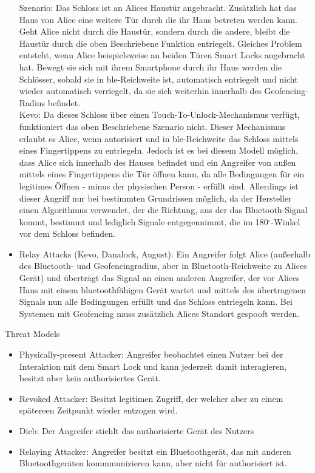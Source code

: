 \begin{itemize}
        Szenario: Das Schloss ist an Alices Haustür angebracht.
        Zusätzlich hat das Haus von Alice eine weitere Tür durch die ihr Haus betreten werden kann.
        Geht Alice nicht durch die Haustür, sondern durch die andere, bleibt die Haustür durch die oben Beschriebene Funktion entriegelt.
        Gleiches Problem entsteht, wenn Alice beispielsweise an beiden Türen Smart Locks angebracht hat.
        Bewegt sie sich mit ihrem Smartphone durch ihr Haus werden die Schlösser, sobald sie in \gls{ble}-Reichweite ist, automatisch entriegelt und nicht wieder automatisch verriegelt, da sie sich weiterhin innerhalb des Geofencing-Radius befindet.\\
        Kevo: Da dieses Schloss über einen Touch-To-Unlock-Mechanismus verfügt, funktioniert das oben Beschriebene Szenario nicht.
        Dieser Mechanismus erlaubt es Alice, wenn autorisiert und in \gls{ble}-Reichweite das Schloss mittels eines Fingertippens zu entriegeln.
        Jedoch ist es bei diesem Modell möglich, dass Alice sich innerhalb des Hauses befindet und ein Angreifer von außen mittels eines Fingertippens die Tür öffnen kann, da alle Bedingungen für ein legitimes Öffnen - minus der physischen Person - erfüllt sind.
        Allerdings ist dieser Angriff nur bei bestimmten Grundrissen möglich, da der Hersteller einen Algorithmus verwendet, der die Richtung, aus der das Bluetooth-Signal kommt, bestimmt und lediglich Signale entgegennimmt, die im 180$^{\circ}$-Winkel vor dem Schloss befinden.
        \item Relay Attacks (Kevo, Danalock, August): Ein Angreifer folgt Alice (außerhalb des Bluetooth- und Geofencingradius, aber in Bluetooth-Reichweite zu Alices Gerät) und überträgt das Signal an einen anderen Angreifer, der vor Alices Haus mit einem bluetoothfähigen Gerät wartet und mittels des übertragenen Signals nun alle Bedingungen erfüllt und das Schloss entriegeln kann.
        Bei Systemen mit Geofencing muss zusätzlich Alices Standort gespooft werden.
	\end{itemize}
	
	Threat Models
	\begin{itemize}
	    \item Physically-present Attacker: Angreifer beobachtet einen Nutzer bei der Interaktion mit dem Smart Lock und kann jederzeit damit interagieren, besitzt aber kein authorisiertes Gerät.
		\item Revoked Attacker: Besitzt legitimen Zugriff, der welcher aber zu einem spätereen Zeitpunkt wieder entzogen wird.
		\item Dieb: Der Angreifer stiehlt das authorisierte Gerät des Nutzers
		\item Relaying Attacker: Angreifer besitzt ein Bluetoothgerät, das mit anderen Bluetoothgeräten kommmunizieren kann, aber nicht für authorisiert ist.
	\end{itemize}
	
